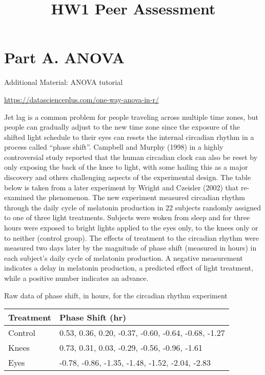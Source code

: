 \documentclass[
]{article}
\title{HW1 Peer Assessment}
\author{}
\date{\vspace{-2.5em}}
\begin{document}
\maketitle

\hypertarget{part-a.-anova}{%
\section{Part A. ANOVA}\label{part-a.-anova}}

Additional Material: ANOVA tutorial

\url{https://datascienceplus.com/one-way-anova-in-r/}

Jet lag is a common problem for people traveling across multiple time
zones, but people can gradually adjust to the new time zone since the
exposure of the shifted light schedule to their eyes can resets the
internal circadian rhythm in a process called ``phase shift''. Campbell
and Murphy (1998) in a highly controversial study reported that the
human circadian clock can also be reset by only exposing the back of the
knee to light, with some hailing this as a major discovery and others
challenging aspects of the experimental design. The table below is taken
from a later experiment by Wright and Czeisler (2002) that re-examined
the phenomenon. The new experiment measured circadian rhythm through the
daily cycle of melatonin production in 22 subjects randomly assigned to
one of three light treatments. Subjects were woken from sleep and for
three hours were exposed to bright lights applied to the eyes only, to
the knees only or to neither (control group). The effects of treatment
to the circadian rhythm were measured two days later by the magnitude of
phase shift (measured in hours) in each subject's daily cycle of
melatonin production. A negative measurement indicates a delay in
melatonin production, a predicted effect of light treatment, while a
positive number indicates an advance.

Raw data of phase shift, in hours, for the circadian rhythm experiment

\begin{longtable}[]{@{}ll@{}}
\toprule
Treatment & Phase Shift (hr) \\
\midrule
\endhead
Control & 0.53, 0.36, 0.20, -0.37, -0.60, -0.64, -0.68, -1.27 \\
Knees & 0.73, 0.31, 0.03, -0.29, -0.56, -0.96, -1.61 \\
Eyes & -0.78, -0.86, -1.35, -1.48, -1.52, -2.04, -2.83 \\
\bottomrule
\end{longtable}
\end{document}
